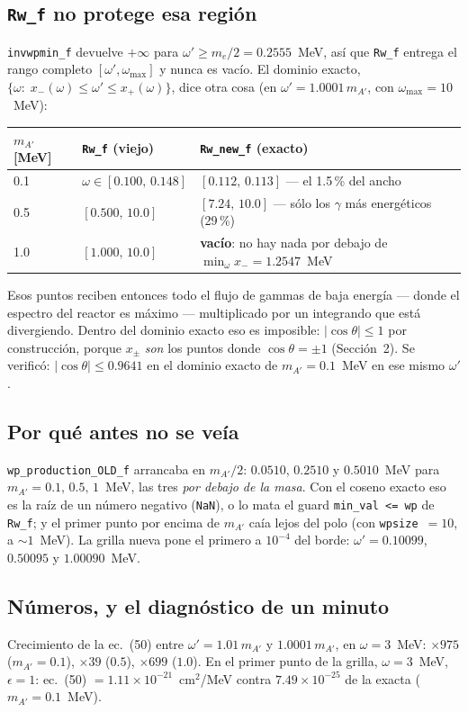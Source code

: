 \documentclass[11pt,a4paper]{article}
\newcommand{\Ap}{A'}
\newcommand{\eps}{\epsilon}
\newcommand{\wpr}{\omega'}
\begin{document}
\subsection{\texttt{Rw\_f} no protege esa región}
\texttt{invwpmin\_f} devuelve $+\infty$ para $\wpr\ge m_e/2=0.2555$~MeV, así que \texttt{Rw\_f} entrega el rango
completo $[\wpr,\omega_{\max}]$ y nunca es vacío. El dominio exacto, $\{\omega:\;x_-(\omega)\le\wpr\le x_+(\omega)\}$,
dice otra cosa (en $\wpr=1.0001\,m_{\Ap}$, con $\omega_{\max}=10$~MeV):

\begin{center}\small
\begin{tabular}{@{}lll@{}}
\toprule
$m_{\Ap}$ [MeV] & \texttt{Rw\_f} (viejo) & \texttt{Rw\_new\_f} (exacto)\\
\midrule
0.1 & $\omega\in[0.100,\,0.148]$ & $[0.112,\,0.113]$ --- el 1.5\,\% del ancho\\
0.5 & $[0.500,\,10.0]$ & $[7.24,\,10.0]$ --- sólo los $\gamma$ más energéticos (29\,\%)\\
1.0 & $[1.000,\,10.0]$ & \textbf{vacío}: no hay nada por debajo de $\min_\omega x_-=1.2547$~MeV\\
\bottomrule
\end{tabular}
\end{center}

\noindent Esos puntos reciben entonces todo el flujo de gammas de baja energía --- donde el espectro del reactor es
máximo --- multiplicado por un integrando que está divergiendo. Dentro del dominio exacto eso es imposible:
$|\cos\theta|\le1$ por construcción, porque $x_\pm$ \emph{son} los puntos donde $\cos\theta=\pm1$ (Sección~2). Se
verificó: $|\cos\theta|\le0.9641$ en el dominio exacto de $m_{\Ap}=0.1$~MeV en ese mismo $\wpr$.

\subsection{Por qué antes no se veía}
\texttt{wp\_production\_OLD\_f} arrancaba en $m_{\Ap}/2$: $0.0510$, $0.2510$ y $0.5010$~MeV para
$m_{\Ap}=0.1,\,0.5,\,1$~MeV, las tres \emph{por debajo de la masa}. Con el coseno exacto eso es la raíz de un número
negativo (\texttt{NaN}), o lo mata el guard \texttt{min\_val <= wp} de \texttt{Rw\_f}; y el primer punto por encima de
$m_{\Ap}$ caía lejos del polo (con \texttt{wpsize}~$=10$, a $\sim1$~MeV). La grilla nueva pone el primero a
$10^{-4}$ del borde: $\wpr=0.10099$, $0.50095$ y $1.00090$~MeV.

\subsection{Números, y el diagnóstico de un minuto}
Crecimiento de la ec.~(50) entre $\wpr=1.01\,m_{\Ap}$ y $1.0001\,m_{\Ap}$, en $\omega=3$~MeV: $\times975$
($m_{\Ap}=0.1$), $\times39$ ($0.5$), $\times699$ ($1.0$). En el primer punto de la grilla, $\omega=3$~MeV,
$\eps=1$: ec.~(50) $=1.11\times10^{-21}$~cm$^2$/MeV contra $7.49\times10^{-25}$ de la exacta ($m_{\Ap}=0.1$~MeV).
\end{document}
